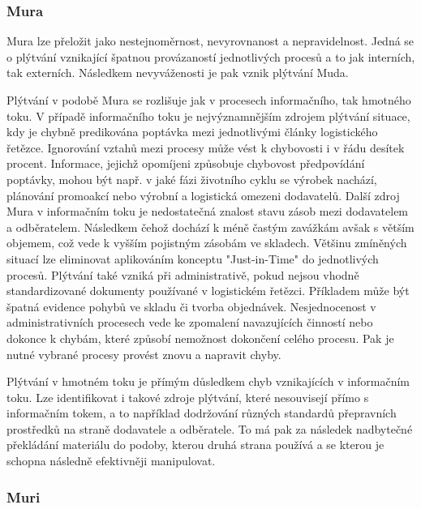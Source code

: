 
\subsubsection*{Mura}

Mura lze přeložit jako nestejnoměrnost, nevyrovnanost a nepravidelnost. Jedná se o plýtvání vznikající špatnou provázaností jednotlivých procesů a to jak interních, tak externích. Následkem nevyváženosti je pak vznik plýtvání Muda. \cite{bib:LW3, bib:Jirsak}

Plýtvání v podobě Mura se rozlišuje jak v procesech informačního, tak hmotného toku. V případě informačního toku je nejvýznamnějším zdrojem plýtvání situace, 
kdy je chybně predikována poptávka mezi jednotlivými články logistického řetězce. Ignorování vztahů mezi procesy může vést k chybovosti i v řádu desítek procent. Informace, jejichž opomíjeni způsobuje chybovost předpovídání poptávky, mohou být např. v jaké fázi životního cyklu se výrobek nachází, plánování promoakcí nebo výrobní a logistická omezeni dodavatelů.
Další zdroj Mura v informačním toku je nedostatečná znalost stavu zásob mezi dodavatelem a odběratelem. Následkem čehož dochází k méně častým zavážkám avšak s větším objemem, což vede k vyšším pojistným zásobám ve skladech. Většinu zmíněných situací lze eliminovat aplikováním konceptu "Just-in-Time" do jednotlivých procesů.
Plýtvání také vzniká při administrativě, pokud nejsou vhodně standardizované dokumenty používané v logistickém řetězci. Příkladem může být špatná evidence pohybů ve skladu či tvorba objednávek. Nesjednocenost v administrativních procesech vede ke zpomalení navazujících činností nebo dokonce k chybám, které způsobí nemožnost dokončení celého procesu. Pak je nutné vybrané procesy provést znovu a napravit chyby.\cite{bib:Jirsak}

Plýtvání v hmotném toku je přímým důsledkem chyb vznikajících v informačním toku. Lze identifikovat i takové zdroje plýtvání, které nesouvisejí přímo s informačním tokem, a to například dodržování různých standardů přepravních prostředků na straně dodavatele a odběratele. To má pak za následek nadbytečné překládání materiálu do podoby, kterou druhá strana používá a se kterou je schopna následně efektivněji manipulovat.\cite{bib:Jirsak}

\subsubsection*{Muri}

